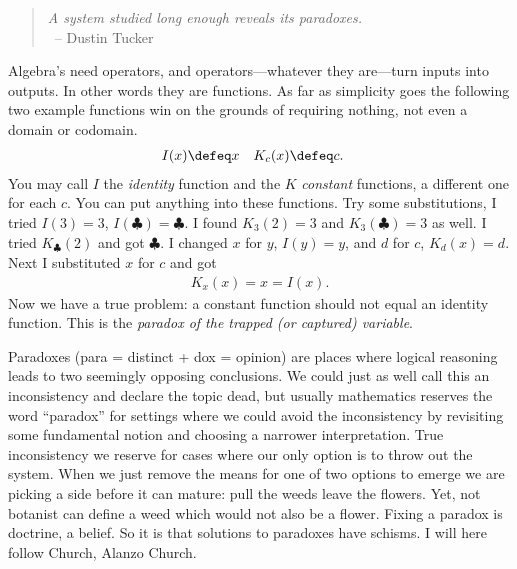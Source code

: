 \begin{quote}
\emph{A system studied long enough reveals its paradoxes.}\\
~\hfill-- Dustin Tucker
\end{quote}
Algebra's need operators, and operators---whatever they are---turn 
inputs into outputs.  In other words they are functions.  
As far as simplicity goes the following two example functions win 
on the grounds of requiring nothing, not even a domain or codomain.
\begin{align*}
    I(x) & \defeq x & 
    K_c(x) & \defeq c.
\end{align*}
You may call $I$ the \emph{identity} function and the $K$ \emph{constant} functions,
a different one for each $c$.  You can put anything into these functions.
Try some substitutions, I tried $I(3)=3$, $I(\clubsuit)=\clubsuit$.
I found $K_3(2)=3$ and $K_3(\clubsuit)=3$ as well.  I tried 
$K_{\clubsuit}(2)$ and got $\clubsuit$.  I changed $x$ for $y$, 
$I(y)=y$, and $d$ for $c$, $K_d(x)=d$. Next I substituted $x$ for $c$ and got
\begin{align*}
    K_x(x)=x=I(x).
\end{align*}
Now we have a true problem: a constant function should not equal 
an identity function.  This is the \emph{paradox of the trapped (or captured) variable}.

Paradoxes (para = distinct + dox = opinion) are places where logical reasoning
leads to two seemingly opposing conclusions.  We could just as well call this an
inconsistency and declare the topic dead, but usually mathematics reserves the
word ``paradox'' for settings where we could avoid the inconsistency by revisiting
some fundamental notion and choosing a narrower interpretation.  True
inconsistency we reserve for cases where our only option is to throw out the
system.  When we just remove the means for one of two options to 
emerge we are picking a side before it can mature: pull the weeds leave the flowers.
Yet, not botanist can define a weed which would not also be a flower.
Fixing a paradox is doctrine, a belief.  So it 
is that solutions to paradoxes have schisms.  I will here follow Church, 
Alanzo Church.\Church
